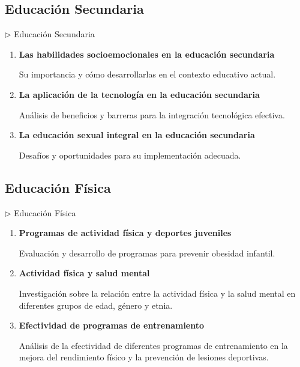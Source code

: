 \documentclass[12pt,a4paper]{article}
\begin{document}
\subsection{Educación Secundaria}

\begin{careerbox}{$\triangleright$ Educación Secundaria}
	\begin{enumerate}
		\item \textbf{Las habilidades socioemocionales en la educación secundaria}
		
		Su importancia y cómo desarrollarlas en el contexto educativo actual.
		
		\item \textbf{La aplicación de la tecnología en la educación secundaria}
		
		Análisis de beneficios y barreras para la integración tecnológica efectiva.
		
		\item \textbf{La educación sexual integral en la educación secundaria}
		
		Desafíos y oportunidades para su implementación adecuada.
	\end{enumerate}
\end{careerbox}

\subsection{Educación Física}

\begin{careerbox}{$\triangleright$ Educación Física}
	\begin{enumerate}
		\item \textbf{Programas de actividad física y deportes juveniles}
		
		Evaluación y desarrollo de programas para prevenir obesidad infantil.
		
		\item \textbf{Actividad física y salud mental}
		
		Investigación sobre la relación entre la actividad física y la salud mental en diferentes grupos de edad, género y etnia.
		
		\item \textbf{Efectividad de programas de entrenamiento}
		
		Análisis de la efectividad de diferentes programas de entrenamiento en la mejora del rendimiento físico y la prevención de lesiones deportivas.
	\end{enumerate}
\end{careerbox}
\end{document}
